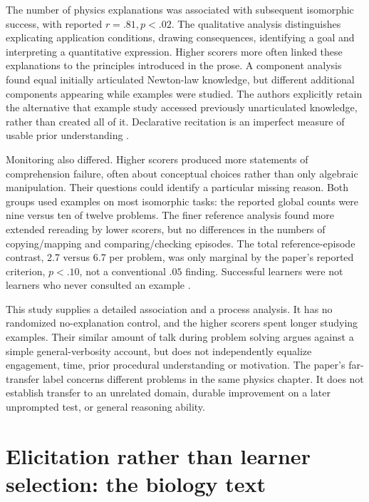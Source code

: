 The number of physics explanations was associated with subsequent
isomorphic success, with reported \(r=.81,p<.02\). The qualitative
analysis distinguishes explicating application conditions, drawing
consequences, identifying a goal and interpreting a quantitative expression.
Higher scorers more often linked these explanations to the principles
introduced in the prose. A component analysis found equal initially
articulated Newton-law knowledge, but different additional components
appearing while examples were studied. The authors explicitly retain the
alternative that example study accessed previously unarticulated knowledge,
rather than created all of it. Declarative recitation is an imperfect
measure of usable prior understanding
\cite[pp.~163--169]{ChiEtAl1989SelfExplanations}.

Monitoring also differed. Higher scorers produced more statements of
comprehension failure, often about conceptual choices rather than only
algebraic manipulation. Their questions could identify a particular missing
reason. Both groups used examples on most isomorphic tasks: the reported
global counts were nine versus ten of twelve problems. The finer reference
analysis found more extended rereading by lower scorers, but no differences
in the numbers of copying/mapping and comparing/checking episodes. The
total reference-episode contrast, 2.7 versus 6.7 per problem, was only
marginal by the paper's reported criterion, \(p<.10\), not a conventional
\(.05\) finding. Successful learners were not learners who never consulted
an example
\cite[pp.~170--175]{ChiEtAl1989SelfExplanations}.

This study supplies a detailed association and a process analysis. It has
no randomized no-explanation control, and the higher scorers spent longer
studying examples. Their similar amount of talk during problem solving
argues against a simple general-verbosity account, but does not independently
equalize engagement, time, prior procedural understanding or motivation.
The paper's far-transfer label concerns different problems in the same
physics chapter. It does not establish transfer to an unrelated domain,
durable improvement on a later unprompted test, or general reasoning ability.

\section{Elicitation rather than learner selection: the biology text}
\label{sec:p19-self-explanation-biology}

